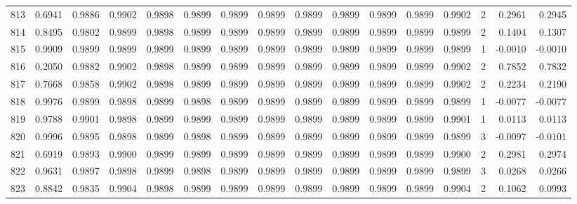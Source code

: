 \begin{tabular}{lrrrrrrrrrrrrrrr}
813 &      0.6941 &  0.9886 &  0.9902 &  0.9898 &  0.9899 &  0.9899 &  0.9899 &  0.9899 &  0.9899 &  0.9899 &   0.9899 &     0.9902 &      2 &                    0.2961 &                     0.2945 \\
814 &      0.8495 &  0.9802 &  0.9899 &  0.9898 &  0.9899 &  0.9899 &  0.9899 &  0.9899 &  0.9899 &  0.9899 &   0.9899 &     0.9899 &      2 &                    0.1404 &                     0.1307 \\
815 &      0.9909 &  0.9899 &  0.9899 &  0.9899 &  0.9899 &  0.9899 &  0.9899 &  0.9899 &  0.9899 &  0.9899 &   0.9899 &     0.9899 &      1 &                   -0.0010 &                    -0.0010 \\
816 &      0.2050 &  0.9882 &  0.9902 &  0.9898 &  0.9899 &  0.9899 &  0.9899 &  0.9899 &  0.9899 &  0.9899 &   0.9899 &     0.9902 &      2 &                    0.7852 &                     0.7832 \\
817 &      0.7668 &  0.9858 &  0.9902 &  0.9898 &  0.9899 &  0.9899 &  0.9899 &  0.9899 &  0.9899 &  0.9899 &   0.9899 &     0.9902 &      2 &                    0.2234 &                     0.2190 \\
818 &      0.9976 &  0.9899 &  0.9898 &  0.9899 &  0.9898 &  0.9899 &  0.9899 &  0.9899 &  0.9899 &  0.9899 &   0.9899 &     0.9899 &      1 &                   -0.0077 &                    -0.0077 \\
819 &      0.9788 &  0.9901 &  0.9898 &  0.9899 &  0.9899 &  0.9899 &  0.9899 &  0.9899 &  0.9899 &  0.9899 &   0.9899 &     0.9901 &      1 &                    0.0113 &                     0.0113 \\
820 &      0.9996 &  0.9895 &  0.9898 &  0.9899 &  0.9898 &  0.9899 &  0.9899 &  0.9899 &  0.9899 &  0.9899 &   0.9899 &     0.9899 &      3 &                   -0.0097 &                    -0.0101 \\
821 &      0.6919 &  0.9893 &  0.9900 &  0.9899 &  0.9899 &  0.9899 &  0.9899 &  0.9899 &  0.9899 &  0.9899 &   0.9899 &     0.9900 &      2 &                    0.2981 &                     0.2974 \\
822 &      0.9631 &  0.9897 &  0.9898 &  0.9899 &  0.9898 &  0.9899 &  0.9899 &  0.9899 &  0.9899 &  0.9899 &   0.9899 &     0.9899 &      3 &                    0.0268 &                     0.0266 \\
823 &      0.8842 &  0.9835 &  0.9904 &  0.9898 &  0.9899 &  0.9899 &  0.9899 &  0.9899 &  0.9899 &  0.9899 &   0.9899 &     0.9904 &      2 &                    0.1062 &                     0.0993 \\

\end{tabular}

